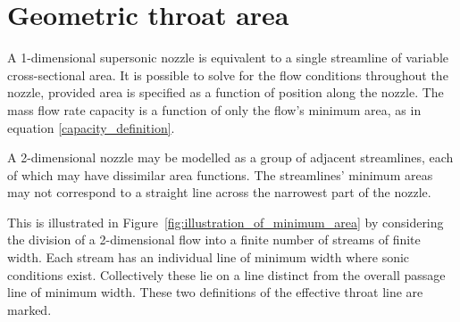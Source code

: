 \documentclass[11pt, twoside]{report}
\begin{document}
\chapter{Geometric throat area}






A 1-dimensional supersonic nozzle is equivalent to a single streamline of variable cross-sectional area. It is possible to solve for the flow conditions throughout the nozzle, provided area is specified as a function of position along the nozzle. The mass flow rate capacity is a function of only the flow's minimum area, as in equation \ref{capacity_definition}.

A 2-dimensional nozzle may be modelled as a group of adjacent streamlines, each of which may have dissimilar area functions. The streamlines' minimum areas may not correspond to a straight line across the narrowest part of the nozzle. 

This is illustrated in Figure~\ref{fig:illustration_of_minimum_area} by considering the division of a 2-dimensional flow into a finite number of streams of finite width. Each stream has an individual line of minimum width where sonic conditions exist. Collectively these lie on a line distinct from the overall passage line of minimum width. These two definitions of the effective throat line are marked.
\end{document}
